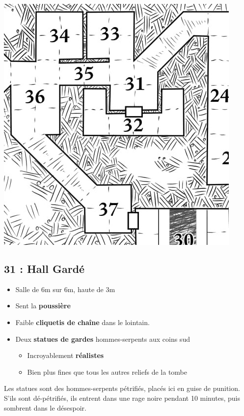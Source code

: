\vfill
\pagebreak
\includegraphics[width=\columnwidth]{pics/map_31-37.jpg}

\subsection{31 : Hall Gardé}\label{n3:s31}
\begin{itemize}
  \item Salle de 6m sur 6m, haute de 3m
  \item Sent la \textbf{poussière}
  \item Faible \textbf{cliquetis de chaîne} dans le lointain.
  \item Deux \textbf{statues de gardes} hommes-serpents aux coins sud
  \begin{itemize}
    \item Incroyablement \textbf{réalistes}
    \item Bien plus fines que tous les autres reliefs de la tombe
  \end{itemize}
\end{itemize}

Les statues sont des hommes-serpents pétrifiés, placés ici en guise de punition.
S’ils sont dé-pétrifiés, ils entrent dans une rage noire pendant 10 minutes, puis sombrent dans le désespoir. 

